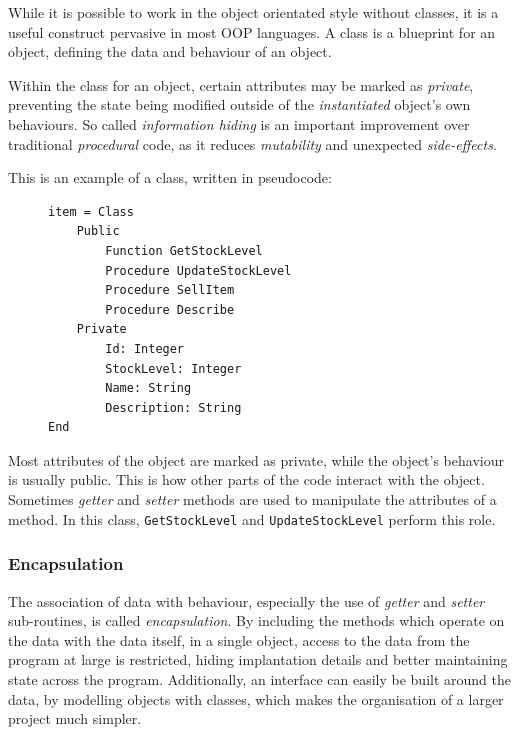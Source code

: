 \documentclass[9pt]{article}
\begin{document}
While it is possible to work in the object orientated style without classes, it is a useful construct pervasive in most OOP languages. A class is a blueprint for an object, defining the data and behaviour of an object.

Within the class for an object, certain attributes may be marked as \emph{private}, preventing the state being modified outside of the \emph{instantiated} object's own behaviours. So called \emph{information hiding} is an important improvement over traditional \emph{procedural} code, as it reduces \emph{mutability} and unexpected \emph{side-effects}.

This is an example of a class, written in pseudocode:

\begin{figure}[H]
\begin{verbatim}
item = Class
    Public
        Function GetStockLevel
        Procedure UpdateStockLevel
        Procedure SellItem
        Procedure Describe
    Private
        Id: Integer
        StockLevel: Integer
        Name: String
        Description: String
End
\end{verbatim}
\end{figure}

Most attributes of the object are marked as private, while the object's behaviour is usually public. This is how other parts of the code interact with the object. Sometimes \emph{getter} and \emph{setter} methods are used to manipulate the attributes of a method. In this class, \texttt{GetStockLevel} and \texttt{UpdateStockLevel} perform this role.

\subsubsection{Encapsulation}
\label{sec:org116f62c}

The association of data with behaviour, especially the use of \emph{getter} and \emph{setter} sub-routines, is called \emph{encapsulation}. By including the methods which operate on the data with the data itself, in a single object, access to the data from the program at large is restricted, hiding implantation details and better maintaining state across the program. Additionally, an interface can easily be built around the data, by modelling objects with classes, which makes the organisation of a larger project much simpler.
\end{document}
